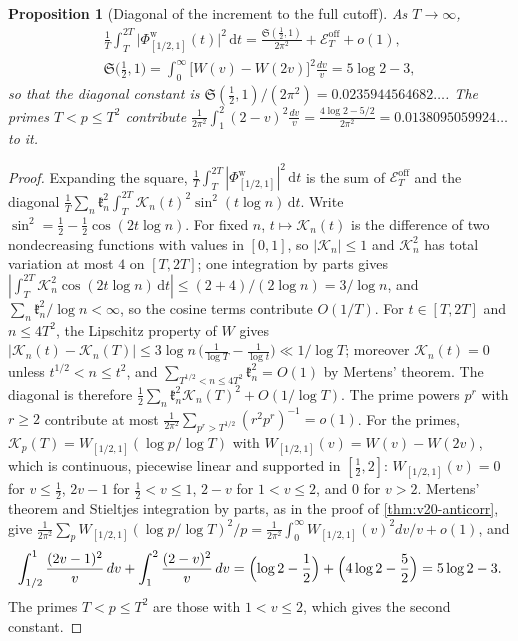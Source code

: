 \documentclass[11pt,a4paper]{article}
\numberwithin{equation}{section}
\newtheorem{proposition}[theorem]{Proposition}
\theoremstyle{definition}
\theoremstyle{remark}
\newcommand{\dd}{\,\mathrm dt}
\begin{document}
\begin{proposition}[Diagonal of the increment to the full cutoff]\label{prop:taucw-inc1}
As $T\to\infty$,
\begin{equation}\label{eq:taucw-inc1}
\begin{gathered}
\frac1T\int_T^{2T}\bigl|\Phi^{\mathrm w}_{[1/2,1]}(t)\bigr|^2\dd=\frac{\mathfrak S(\frac12,1)}{2\pi^2}+\mathscr E^{\mathrm{off}}_T+o(1),\\
\mathfrak S\bigl(\tfrac12,1\bigr)=\int_0^\infty\bigl[W(v)-W(2v)\bigr]^2\frac{dv}v=5\log2-3,
\end{gathered}
\end{equation}
so that the diagonal constant is $\mathfrak S(\frac12,1)/(2\pi^2)=0.0235944564682\ldots$. The primes $T<p\le T^2$ contribute $\frac1{2\pi^2}\int_1^2(2-v)^2\frac{dv}v=\frac{4\log2-5/2}{2\pi^2}=0.0138095059924\ldots$ to it.
\end{proposition}
\begin{proof}
Expanding the square, $\frac1T\int_T^{2T}|\Phi^{\mathrm w}_{[1/2,1]}|^2\dd$ is the sum of $\mathscr E^{\mathrm{off}}_T$ and the diagonal $\frac1T\sum_n\mathfrak k_n^2\int_T^{2T}\mathscr K_n(t)^2\sin^2(t\log n)\dd$. Write $\sin^2=\frac12-\frac12\cos(2t\log n)$. For fixed $n$, $t\mapsto\mathscr K_n(t)$ is the difference of two nondecreasing functions with values in $[0,1]$, so $|\mathscr K_n|\le1$ and $\mathscr K_n^2$ has total variation at most $4$ on $[T,2T]$; one integration by parts gives $|\int_T^{2T}\mathscr K_n^2\cos(2t\log n)\dd|\le(2+4)/(2\log n)=3/\log n$, and $\sum_n\mathfrak k_n^2/\log n<\infty$, so the cosine terms contribute $O(1/T)$. For $t\in[T,2T]$ and $n\le4T^2$, the Lipschitz property of $W$ gives $|\mathscr K_n(t)-\mathscr K_n(T)|\le3\log n\,\bigl(\frac1{\log T}-\frac1{\log t}\bigr)\ll1/\log T$; moreover $\mathscr K_n(t)=0$ unless $t^{1/2}<n\le t^2$, and $\sum_{T^{1/2}<n\le4T^2}\mathfrak k_n^2=O(1)$ by Mertens' theorem. The diagonal is therefore $\frac12\sum_n\mathfrak k_n^2\mathscr K_n(T)^2+O(1/\log T)$. The prime powers $p^r$ with $r\ge2$ contribute at most $\frac1{2\pi^2}\sum_{p^r>T^{1/2}}(r^2p^r)^{-1}=o(1)$. For the primes, $\mathscr K_p(T)=W_{[1/2,1]}(\log p/\log T)$ with $W_{[1/2,1]}(v)=W(v)-W(2v)$, which is continuous, piecewise linear and supported in $[\frac12,2]$: $W_{[1/2,1]}(v)=0$ for $v\le\frac12$, $2v-1$ for $\frac12<v\le1$, $2-v$ for $1<v\le2$, and $0$ for $v>2$. Mertens' theorem and Stieltjes integration by parts, as in the proof of \cref{thm:v20-anticorr}, give $\frac1{2\pi^2}\sum_pW_{[1/2,1]}(\log p/\log T)^2/p=\frac1{2\pi^2}\int_0^\infty W_{[1/2,1]}(v)^2dv/v+o(1)$, and
\begin{equation}
\int_{1/2}^1\frac{(2v-1)^2}v\,dv+\int_1^2\frac{(2-v)^2}v\,dv=\Bigl(\log2-\frac12\Bigr)+\Bigl(4\log2-\frac52\Bigr)=5\log2-3 .
\end{equation}
The primes $T<p\le T^2$ are those with $1<v\le2$, which gives the second constant.
\end{proof}
\end{document}
